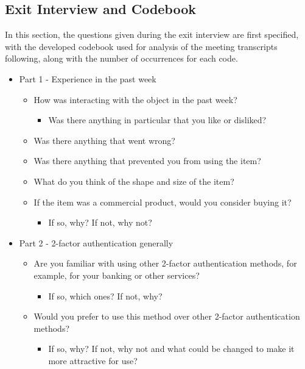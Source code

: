 \documentclass{l4proj}
\begin{document}
\begin{appendices}
\chapter{Exit Interview and Codebook}

In this section, the questions given during the exit interview are first specified, with the developed codebook used for analysis of the meeting transcripts following, along with the number of occurrences for each code.

\begin{itemize}
    \item Part 1 - Experience in the past week
    \begin{itemize}
        \item How was interacting with the object in the past week?
        \begin{itemize}
            \item Was there anything in particular that you like or disliked?
        \end{itemize}
        \item Was there anything that went wrong?
        \item Was there anything that prevented you from using the item?
        \item What do you think of the shape and size of the item?
        \item If the item was a commercial product, would you consider buying it?
        \begin{itemize}
            \item If so, why? If not, why not?
        \end{itemize}
    \end{itemize}
    \item Part 2 - 2-factor authentication generally
    \begin{itemize}
        \item Are you familiar with using other 2-factor authentication methods, for example, for your banking or other services?
        \begin{itemize}
            \item If so, which ones? If not, why?
        \end{itemize}
        \item Would you prefer to use this method over other 2-factor authentication methods?
        \begin{itemize}
            \item If so, why? If not, why not and what could be changed to make it more attractive for use?

\end{itemize}
\end{itemize}
\end{itemize}
\end{appendices}
\end{document}
